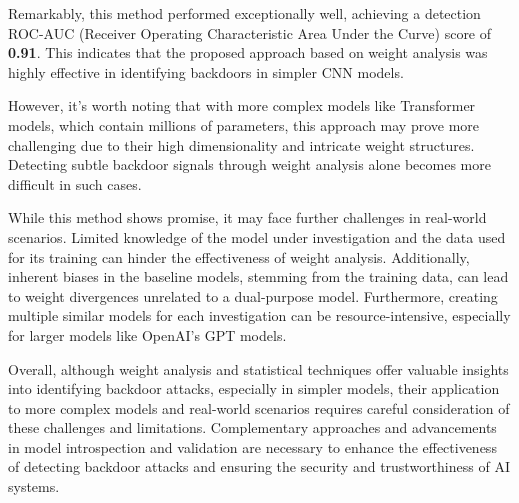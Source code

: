 Remarkably, this method performed exceptionally well, achieving a detection ROC-AUC (Receiver Operating Characteristic Area Under the Curve) score of \textbf{0.91}. This indicates that the proposed approach based on weight analysis was highly effective in identifying backdoors in simpler CNN models.

However, it's worth noting that with more complex models like Transformer models, which contain millions of parameters, this approach may prove more challenging due to their high dimensionality and intricate weight structures. Detecting subtle backdoor signals through weight analysis alone becomes more difficult in such cases.

While this method shows promise, it may face further challenges in real-world scenarios. Limited knowledge of the model under investigation and the data used for its training can hinder the effectiveness of weight analysis. Additionally, inherent biases in the baseline models, stemming from the training data, can lead to weight divergences unrelated to a dual-purpose model. Furthermore, creating multiple similar models for each investigation can be resource-intensive, especially for larger models like OpenAI's GPT models.

Overall, although weight analysis and statistical techniques offer valuable insights into identifying backdoor attacks, especially in simpler models, their application to more complex models and real-world scenarios requires careful consideration of these challenges and limitations. Complementary approaches and advancements in model introspection and validation are necessary to enhance the effectiveness of detecting backdoor attacks and ensuring the security and trustworthiness of AI systems.


